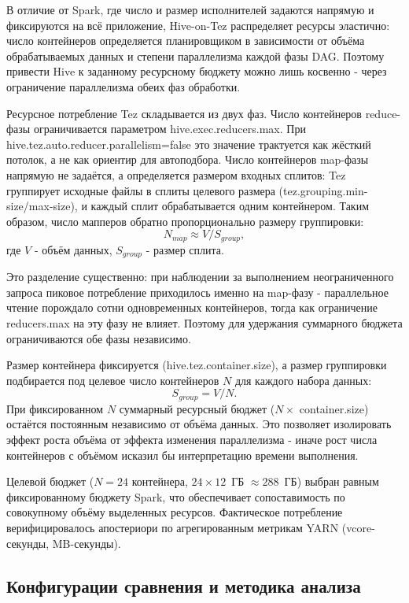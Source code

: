 \documentclass[12pt,letterpaper, onecolumn]{exam}
\begin{document}
В отличие от Spark, где число и размер исполнителей задаются напрямую и фиксируются на всё приложение, Hive-on-Tez распределяет ресурсы эластично: число контейнеров определяется планировщиком в зависимости от объёма обрабатываемых данных и степени параллелизма каждой фазы DAG. Поэтому привести Hive к заданному ресурсному бюджету можно лишь косвенно - через ограничение параллелизма обеих фаз обработки.

Ресурсное потребление Tez складывается из двух фаз. Число контейнеров reduce-фазы ограничивается параметром hive.exec.reducers.max. При hive.tez.auto.reducer.parallelism=false это значение трактуется как жёсткий потолок, а не как ориентир для автоподбора. Число контейнеров map-фазы напрямую не задаётся, а определяется размером входных сплитов: Tez группирует исходные файлы в сплиты целевого размера (tez.grouping.min-size/max-size), и каждый сплит обрабатывается одним контейнером. Таким образом, число мапперов обратно пропорционально размеру группировки:
\[
N_{map} \approx V / S_{group},
\]
где $V$ - объём данных, $S_{group}$ - размер сплита.

Это разделение существенно: при наблюдении за выполнением неограниченного запроса пиковое потребление приходилось именно на map-фазу - параллельное чтение порождало сотни одновременных контейнеров, тогда как ограничение reducers.max на эту фазу не влияет. Поэтому для удержания суммарного бюджета ограничиваются обе фазы независимо.

Размер контейнера фиксируется (hive.tez.container.size), а размер группировки подбирается под целевое число контейнеров $N$ для каждого набора данных:
\[
S_{group} = V / N.
\]
При фиксированном $N$ суммарный ресурсный бюджет ($N \times$ container.size) остаётся постоянным независимо от объёма данных. Это позволяет изолировать эффект роста объёма от эффекта изменения параллелизма - иначе рост числа контейнеров с объёмом исказил бы интерпретацию времени выполнения.

Целевой бюджет ($N = 24$ контейнера, $24 \times 12$~ГБ $\approx 288$~ГБ) выбран равным фиксированному бюджету Spark, что обеспечивает сопоставимость по совокупному объёму выделенных ресурсов. Фактическое потребление верифицировалось апостериори по агрегированным метрикам YARN (vcore-секунды, MB-секунды).

\subsection{Конфигурации сравнения и методика анализа}
\label{sec:configs}
\end{document}
